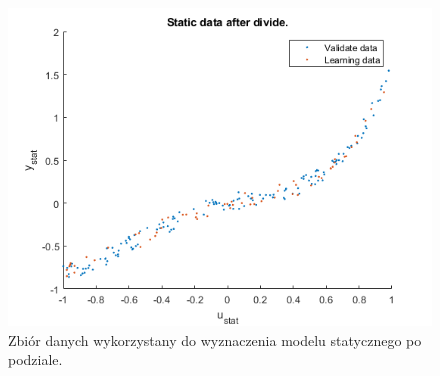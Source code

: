 \begin{figure}[H]
\centering
\includegraphics[width=15cm]{images/25.png}
\caption{Zbiór danych wykorzystany do wyznaczenia modelu statycznego po podziale.}
\label{fig:1}
\end{figure}
